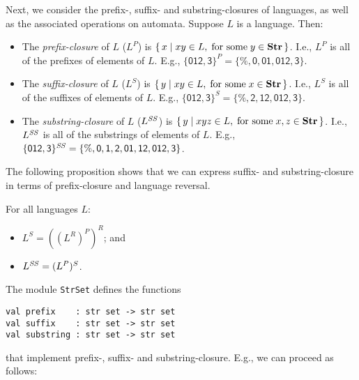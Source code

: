 Next, we consider the prefix-, suffix- and substring-closures of
%
%
%
%
%
%
languages, as well as the associated operations on automata.  Suppose
$L$ is a language.  Then:
\begin{itemize}
\item The \emph{prefix-closure} of $L$ ($L^P$) is $\{ \, x \mid xy\in L,
\;\allowbreak\mbox{for some}\allowbreak\;y\in\mathbf{Str} \, \}$.  I.e., $L^P$ is all of the prefixes
of elements of $L$.  E.g., $\{\mathsf{012,3}\}^P =
\{\mathsf{\%,0,01,012,3}\}$.

\item The \emph{suffix-closure} of $L$ ($L^S$) is $\{ \, y \mid xy\in L,
\;\allowbreak\mbox{for some}\allowbreak\;x\in\mathbf{Str} \, \}$.  I.e., $L^S$ is all of the suffixes
of elements of $L$.  E.g., $\{\mathsf{012,3}\}^S =
\{\mathsf{\%,2,12,012,3}\}$.

\item The \emph{substring-closure} of $L$ ($L^{\mathit{SS}}$) is $\{ \, y \mid xyz\in L,
\;\allowbreak\mbox{for some}\allowbreak\;x,z\in\mathbf{Str} \, \}$.  I.e., $L^{\mathit{SS}}$ is all of the substrings
of elements of $L$.  E.g., $\{\mathsf{012,3}\}^{\mathit{SS}} =
\{\mathsf{\%, 0, 1, 2, 01, 12, 012, 3}\}$.
\end{itemize}

The following proposition shows that we can express suffix- and
substring-closure in terms of prefix-closure and language reversal.

\begin{proposition}
\label{PrefixSuffixSubstringClosure}
For all languages $L$:
\begin{itemize}
\item $L^S = ((L^R)^P)^R$; and

\item $L^{\mathit{SS}} = (L^P)^S$.
\end{itemize}
\end{proposition}

The module \texttt{StrSet}
%
defines the functions
\begin{verbatim}
val prefix    : str set -> str set
val suffix    : str set -> str set
val substring : str set -> str set
\end{verbatim}
%
%
%
that implement prefix-, suffix- and substring-closure. 
E.g., we can proceed as follows:



